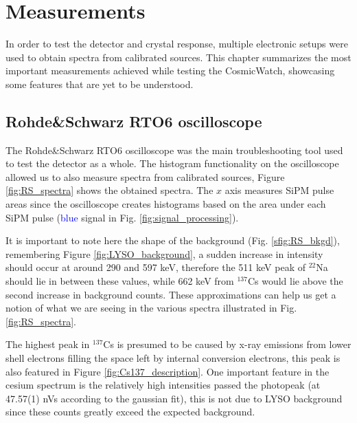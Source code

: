 \chapter{Measurements}\label{chap:measurements}

In order to test the detector and crystal response, multiple electronic setups were used to obtain spectra from calibrated sources. This chapter summarizes the most important measurements achieved while testing the CosmicWatch, showcasing some features that are yet to be understood.

\section{Rohde\&Schwarz RTO6 oscilloscope}

The Rohde\&Schwarz RTO6 oscilloscope was the main troubleshooting tool used to test the detector as a whole. The histogram functionality on the oscilloscope allowed us to also measure spectra from calibrated sources, Figure \ref{fig:RS_spectra} shows the obtained spectra. The $x$ axis measures SiPM pulse areas since the oscilloscope creates histograms based on the area under each SiPM pulse (\textcolor{blue}{blue} signal in Fig. \ref{fig:signal_processing}).

It is important to note here the shape of the background (Fig. \ref{sfig:RS_bkgd}), remembering Figure \ref{fig:LYSO_background}, a sudden increase in intensity should occur at around 290 and 597 \unit{\kilo\eV}, therefore the 511 \unit{\kilo\eV} peak of $^{22}$Na should lie in between these values, while 662 \unit{\kilo\eV} from $^{137}$Cs would lie above the second increase in background counts. These approximations can help us get a notion of what we are seeing in the various spectra illustrated in Fig. \ref{fig:RS_spectra}.

The highest peak in $^{137}$Cs is presumed to be caused by x-ray emissions from lower shell electrons filling the space left by internal conversion electrons, this peak is also featured in Figure \ref{fig:Cs137_description}. One important feature in the cesium spectrum is the relatively high intensities passed the photopeak (at 47.57(1) nVs according to the gaussian fit), this is not due to LYSO background since these counts greatly exceed the expected background.

